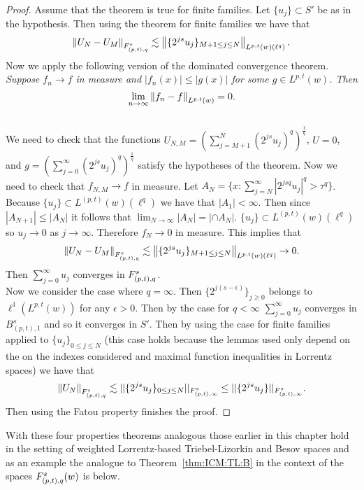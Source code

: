 {\begin{proof}
Assume that the theorem is true for finite families. Let $\{u_j\} \subset S'$ be as in the hypothesis. Then using the theorem for finite families we have that 
\begin{equation}
\norm{U_N - U_M}{\itl{(p,t)}{s}{q}} \lesssim \norm{ \{2^{js} u_j\}_{M+1\leq j \leq N}}{L^{p,t}(w)(\ell^q)}.
\end{equation}
Now we apply the following version of the dominated convergence theorem. 
\\
\bigskip
\textit{Suppose $f_n \rightarrow f$ in measure and $|f_n (x)| \leq |g(x)|$ for some $g\in L^{p,t}(w)$. Then $$\lim_{n\rightarrow\infty} \norm{f_n-f}{L^{p,t}(w)} = 0.$$}
\\
\bigskip
We need to check that the functions $U_{N,M} = \left(\sum_{j=M+1}^{N} (2^{js} u_j)^q \right)^\frac{1}{q}$, $U=0$, and $g = \left(\sum_{j=0}^\infty (2^{js}u_j)^q \right)^\frac{1}{q}$ satisfy the hypotheses of the theorem. Now we need to check that $f_{N,M}\rightarrow f$ in measure. Let $A_N = \{ x : \sum^\infty_{j=N} |2^{jsq}u_j|^q > \tau^q \}$. Because $\{u_j\} \subset L^{(p,t)}(w)(\ell^{q})$ we have that $|A_1| < \infty$. Then since $|A_{N+1}| \leq |A_{N}|$ it follows that $\lim_{N\rightarrow\infty} |A_N| = |\cap A_N|$. $\{u_j\} \subset L^{(p,t)}(w)(\ell^{q})$ so $u_j \rightarrow 0$ as $j\rightarrow\infty$. Therefore $f_N \rightarrow 0$ in measure. This implies that 
$$ \norm{U_N - U_M}{\itl{(p,t)}{s}{q}} \lesssim \norm{\{2^{js}u_j\}_{M+1\leq j \leq N}}{L^{p,t}(w)(\ell^q)} \rightarrow 0.$$
Then $\sum_{j=0}^\infty u_j$ converges in $\itl{(p,t)}{s}{q}$. 
\\
Now we consider the case where $q=\infty$. Then $\{2^{j(s-\epsilon)}\}_{j\geq0}$ belongs to $\ell^1(L^{p,t}(w))$ for any $\epsilon >0$. Then by the case for $q<\infty$ $\sum_{j=0}^\infty u_j$ converges in $B^s_{(p,t),1}$ and so it converges in $S'$. Then by using the case for finite families applied to $\{u_j\}_{0\leq j \leq N}$ (this case holds because the lemmas used only depend on the on the indexes considered and maximal function inequalities in Lorrentz spaces) we have that 
\[ \norm{U_N}{\itl{(p,t)}{s}{q}} \lesssim ||\{2^{js}u_j\}_{0\leq j \leq N}||_{F^s_{(p,t),\infty}} \leq ||\{2^{js}u_j\}||_{F^s_{(p,t),\infty}}. \] Then using the Fatou property finishes the proof.
\end{proof}

With these four properties theorems analogous those earlier in this chapter hold in the setting of weighted Lorrentz-based Triebel-Lizorkin and Besov spaces and as an example the analogue to Theorem~\ref{thm:ICM:TL:B} in the context of the spaces $\itlw{(p,t)}{s}{q}{w}$ is below.


}
